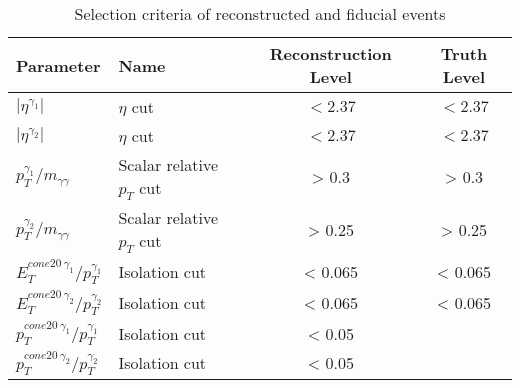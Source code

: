 \documentclass[a4paper, oneside, 11pt, openright]{book}
\begin{document}
 			\begin{table}[tbp]
 				\centering
					\begin{tabular}{llcc}
						\toprule[1.5pt]
						Parameter									& Name						& Reconstruction Level	& Truth Level		\\
						\midrule
						$|\eta^{\gamma_1}|$							& $\eta$ cut				& $<2.37$ 				& $<2.37$			\\
						$|\eta^{\gamma_2}|$							& $\eta$ cut				& $<2.37$ 				& $<2.37$			\\
						$p_T^{\gamma_1}/m_{\gamma\gamma}$			& Scalar relative $p_T$ cut & > 0.3					& > 0.3    			\\
						$p_T^{\gamma_2}/m_{\gamma\gamma}$			& Scalar relative $p_T$ cut & > 0.25				& > 0.25			\\
						$E_{T}^{cone20\ \gamma_1}/p_T^{\gamma_1}$ 	& Isolation cut 			& < 0.065				& < 0.065 			\\
						$E_{T}^{cone20\ \gamma_2}/p_T^{\gamma_2}$ 	& Isolation cut 			& < 0.065				& < 0.065			\\
						$p_{T}^{cone20\ \gamma_1}/p_T^{\gamma_1}$ 	& Isolation cut 			& < 0.05				& 		 			\\
						$p_{T}^{cone20\ \gamma_2}/p_T^{\gamma_2}$ 	& Isolation cut 			& < 0.05				& 					\\
						\bottomrule[1.5pt]
					\end{tabular}
 				\caption{Selection criteria of reconstructed and fiducial events}
 				\label{tab:MC_sel}
 			\end{table}
 		
\end{document}
